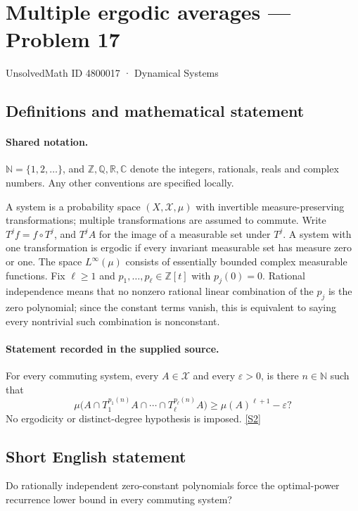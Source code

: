 \documentclass[11pt]{article}
\newcommand{\sref}[2]{\hyperlink{source:#1:#2}{[S#2]}}
\begin{document}
\setcounter{section}{4800016}
\section{Multiple ergodic averages — Problem 17}\label{4800017}
{\small\sffamily UnsolvedMath ID 4800017 · Dynamical Systems}
\subsection{Definitions and mathematical statement}

\paragraph{Shared notation.}$\mathbb N=\{1,2,\ldots\}$, and $\mathbb Z,\mathbb Q,\mathbb R,\mathbb C$ denote the integers, rationals, reals and complex numbers. Any other conventions are specified locally.


A system is a probability space $(X,\mathcal X,\mu)$ with invertible measure-preserving transformations; multiple transformations are assumed to commute. Write $T^j f=f\circ T^j$, and $T^j A$ for the image of a measurable set under $T^j$. A system with one transformation is ergodic if every invariant measurable set has measure zero or one. The space $L^\infty(\mu)$ consists of essentially bounded complex measurable functions. Fix $\ell\ge1$ and $p_1,\ldots,p_\ell\in\mathbb Z[t]$ with $p_j(0)=0$. Rational independence means that no nonzero rational linear combination of the $p_j$ is the zero polynomial; since the constant terms vanish, this is equivalent to saying every nontrivial such combination is nonconstant.
\paragraph{Statement recorded in the supplied source.}
For every commuting system, every $A\in\mathcal X$ and every $\varepsilon>0$, is there $n\in\mathbb N$ such that \[\mu\bigl(A\cap T_1^{p_1(n)}A\cap\cdots\cap T_\ell^{p_\ell(n)}A\bigr)\ge\mu(A)^{\ell+1}-\varepsilon?\] No ergodicity or distinct-degree hypothesis is imposed. \sref{4800017}{2}
\subsection{Short English statement}
Do rationally independent zero-constant polynomials force the optimal-power recurrence lower bound in every commuting system?
\end{document}
